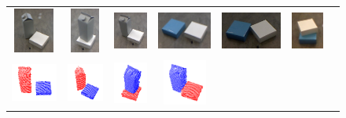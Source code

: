 \begin{figure}[h!]
\begin{tabular}{ccccccc}
    \includegraphics[height=1.5cm]{pictures/22.jpg}&
    \includegraphics[height=1.5cm]{pictures/32.jpg}&
    \includegraphics[height=1.5cm]{pictures/42.jpg}&
    \includegraphics[height=1.5cm]{pictures/52.jpg}&
    \includegraphics[height=1.5cm]{pictures/62.jpg}&
    \includegraphics[height=1.5cm]{pictures/72.jpg}\\
    \includegraphics[height=1.5cm]{pictures/13.png}&
    \includegraphics[height=1.5cm]{pictures/23.png}&
    \includegraphics[height=1.5cm]{pictures/33.png}&
    \includegraphics[height=1.5cm]{pictures/43.png}&

\end{tabular}
\end{figure}
